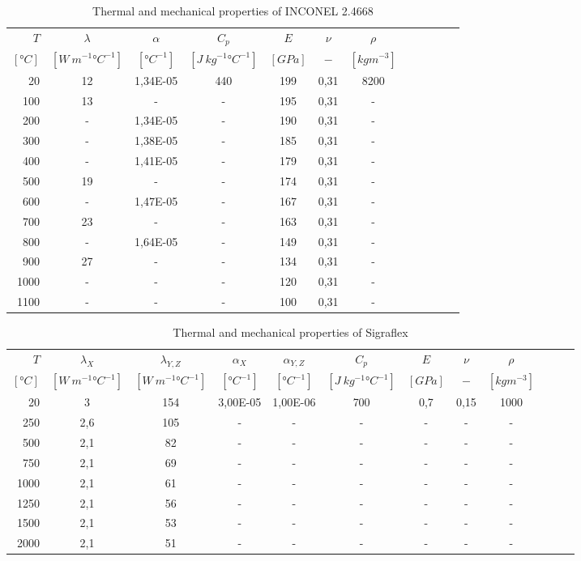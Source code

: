 \begin{table}\centering
    \begin{tabular}{@{}rccccccccccc@{}}\toprule
    $T$ & $\lambda$ & $\alpha$ & $C_p$ & $E$ & $\nu$ & $\rho$\\
    \cmidrule{1-7}
    $[\si{\degree} C]$ & $[W \ m^{-1} \si{\degree} C^{-1}]$ & $[\si{\degree} C^{-1}]$ & $[J \ kg^{-1} \si{\degree} C^{-1}]$ & $[GPa]$ & $-$ & $[kg m^{-3}]$\\
    \midrule
    20 & 12 & 1,34E-05 & 440 & 199 & 0,31 & 8200 \\
    100 & 13 & - & - & 195 & 0,31 & - \\
    200 & - & 1,34E-05 & - & 190 & 0,31 & - \\
    300 & - & 1,38E-05 & - & 185 & 0,31 & - \\
    400 & - & 1,41E-05 & - & 179 & 0,31 & - \\
    500 & 19 & - & - & 174 & 0,31 & - \\
    600 & - & 1,47E-05 & - & 167 & 0,31 & - \\
    700 & 23 & - & - & 163 & 0,31 & - \\
    800 & - & 1,64E-05 & - & 149 & 0,31 & - \\
    900 & 27 & - & - & 134 & 0,31 & - \\
    1000 & - & - & - & 120 & 0,31 & - \\
    1100 & - & - & - & 100 & 0,31 & - \\
\bottomrule
\end{tabular}
\caption{Thermal and mechanical properties of INCONEL 2.4668}
\end{table}

\begin{table}\centering
    \begin{tabular}{@{}rccccccccccc@{}}\toprule
    $T$ & $\lambda_X$ & $\lambda_{Y,Z}$ & $\alpha_X$ & $\alpha_{Y,Z}$ & $C_p$ & $E$ & $\nu$ & $\rho$\\
    \cmidrule{1-9}
    $[\si{\degree} C]$ & $[W \ m^{-1} \si{\degree} C^{-1}]$ & $[W \ m^{-1} \si{\degree} C^{-1}]$ & $[\si{\degree} C^{-1}]$ & $[\si{\degree} C^{-1}]$ & $[J \ kg^{-1} \si{\degree} C^{-1}]$ & $[GPa]$ & $-$ & $[kg m^{-3}]$\\
    \midrule
    20 & 3 & 154 & 3,00E-05 & 1,00E-06 & 700 & 0,7 & 0,15 & 1000 \\
    250 & 2,6 & 105 & - & - & - & - & - & - \\
    500 & 2,1 & 82 & - & - & - & - & - & - \\
    750 & 2,1 & 69 & - & - & - & - & - & - \\
    1000 & 2,1 & 61 & - & - & - & - & - & - \\
    1250 & 2,1 & 56 & - & - & - & - & - & - \\
    1500 & 2,1 & 53 & - & - & - & - & - & - \\
    2000 & 2,1 & 51 & - & - & - & - & - & - \\
\bottomrule
\end{tabular}
\caption{Thermal and mechanical properties of \acrlong{Sigraflex}}
\end{table}
\newpage